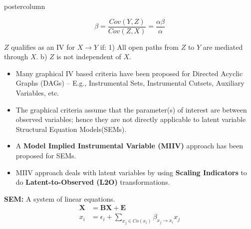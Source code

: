 \documentclass{beamer}
\begin{document}
\begin{frame}
\begin{columns}
\begin{column}{.33\textwidth}
\begin{beamercolorbox}[center]{postercolumn}
\begin{minipage}{.98\textwidth}
{\begin{myblock}{}
				\begin{figure}
					\centering
					\begin{subfigure}{0.5\linewidth}
						\centering
						\caption*{}
					\end{subfigure}%
					\begin{subfigure}{0.5\linewidth}
						\centering
						$$ \beta = \frac{Cov(Y, Z)}{Cov(Z, X)} = \frac{\alpha \beta}{\alpha}$$
						\caption*{}
					\end{subfigure}
				\end{figure}
			\vspace{-0.9em}
			$ Z $ qualifies as an IV for $ X \to Y $ if: 1)
			All open paths from $ Z $ to $ Y $ are mediated through
			$ X $. b) $ Z $ is not independent of $ X $.
		\vspace{0.9em}

		\begin{itemize}
			\item \justifying Many graphical IV based criteria have been
				proposed for Directed Acyclic Graphs (DAGs) --
				E.g., Instrumental Sets, Instrumental Cutsets,
				Auxiliary Variables, etc.
			\item \justifying The graphical criteria assume that
				the parameter(s) of interest are between
				observed variables; hence they are not directly
				applicable to latent variable Structural Equation Models(SEMs).
			\item \justifying A \textbf{Model Implied Instrumental
				Variable (MIIV)} approach has been proposed for
				SEMs.
			\item \justifying MIIV approach deals with latent
				variables by using \textbf{Scaling
				Indicators} to do \textbf{Latent-to-Observed (L2O)}
				transformations.
		\end{itemize}
	\end{myblock}\vfill
	\begin{myblock}{}
		\justifying \textbf{SEM:} A system of linear equations.
			\begin{equation*}
				\begin{split}
					\bm{X} &= \bm{BX} + \bm{E} \\
					x_i &= \epsilon_i + \sum_{x_j \in Co(x_i)} \beta_{x_j \to x_i} x_j 
				\end{split}
			\end{equation*}


\end{myblock}}
\end{minipage}
\end{beamercolorbox}
\end{column}
\end{columns}
\end{frame}
\end{document}
